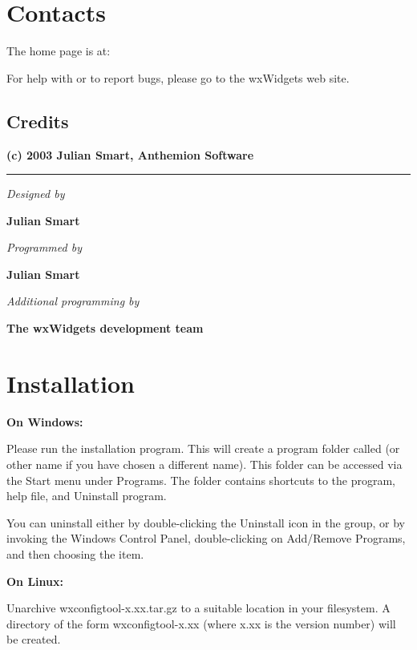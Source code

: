 \chapter{Contacts}%
%
\setfooter{\thepage}{}{}{}{}{\thepage}%

The \ctname home page is at:

{\tt \cturl}

For help with \ctshortname or to report bugs,
please go to the wxWidgets web site.

\section{Credits}

\begin{center}
{\bf (c) 2003 Julian Smart, Anthemion Software}\hrule

{\it Designed by}

{\bf Julian Smart}

{\it Programmed by}

{\bf Julian Smart}

{\it Additional programming by}

{\bf The wxWidgets development team}

\end{center}

\chapter{Installation}%
%
\setfooter{\thepage}{}{}{}{}{\thepage}%

{\bf On Windows:}

Please run the installation program. This will create a program
folder called \ctname (or other name if you have chosen a different name). This
folder can be accessed via the Start menu under Programs. The
folder contains shortcuts to the program, help file, and Uninstall program.

You can uninstall \ctshortname either by double-clicking the Uninstall \ctshortname icon
in the \ctname group, or by invoking the Windows Control Panel,
double-clicking on Add/Remove Programs, and then choosing the \ctshortname item.

{\bf On Linux:}

Unarchive wxconfigtool-x.xx.tar.gz to a suitable location
in your filesystem. A directory of the form wxconfigtool-x.xx
(where x.xx is the version number) will be created.

